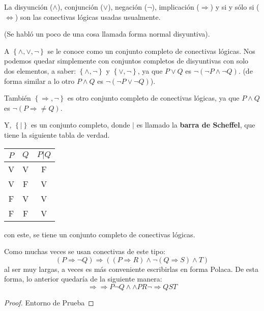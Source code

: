 \documentclass[12pt]{report}
\theoremstyle{largebreak}
\begin{document}
    La disyunción ($\land$), conjunción ($\lor$), negación ($\neg$), implicación ($\Rightarrow$) y si y sólo si ($\iff$) son las conectivas lógicas usadas usualmente. 

    (Se habló un poco de una cosa llamada forma normal disyuntiva).
    
    A $\left\{\land, \lor, \neg \right\}$ se le conoce como un conjunto completo de conectivas lógicas. Nos podemos quedar simplemente con conjuntos completos de disyuntivas con solo dos elementos, a saber: $\left\{\land, \neg \right\}$ y $\left\{\lor, \neg \right\}$, ya que $P\lor Q$ es $\neg(\neg P\land \neg Q)$. (de forma similar a lo otro $P\land Q$ es $\neg(\neg P\lor \neg Q)$).

    También $\left\{\Rightarrow, \neg \right\}$ es otro conjunto completo de conectivas lógicas, ya que $P\land Q$ es $\neg(P\Rightarrow\neq Q)$.

    Y, $\left\{|\right\}$ es un conjunto completo, donde $|$ es llamado la \textbf{barra de Scheffel}, que tiene la siguiente tabla de verdad.

    \begin{center}
        \begin{tabular}{c c | c}
            \hline
            $P$ & $Q$ & $P|Q$ \\
            \hline
            V & V & F \\
            V & F & V \\
            F & V & V \\
            F & F & V \\
        \end{tabular}
    \end{center}
    con este, se tiene un conjunto completo de conectivas lógicas.

    Como muchas veces se usan conectivas de este tipo:
    \begin{equation*}
        (P\Rightarrow \neg Q)\Rightarrow((P\Rightarrow R)\land\neg(Q\Rightarrow S)\land T)
    \end{equation*}
    al ser muy largas, a veces es más conveniente escribirlas en forma Polaca. De esta forma, lo anterior quedaría de la siguiente manera:
    \begin{equation*}
        \Rightarrow\Rightarrow P\neg Q\land\land PR\neg\Rightarrow Q S T 
    \end{equation*}
    \newpage

    \begin{proof}
        Entorno de Prueba
    \end{proof}
\end{document}
